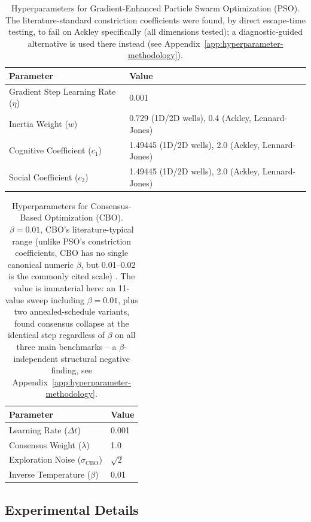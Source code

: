 \documentclass{article} %
\theoremstyle{plain}
\theoremstyle{definition}
\theoremstyle{remark}
\begin{document}
\begin{table}[!htbp]
\centering
\caption{Hyperparameters for Gradient-Enhanced Particle Swarm Optimization (PSO). The literature-standard constriction coefficients were found, by direct escape-time testing, to fail on Ackley specifically (all dimensions tested); a diagnostic-guided alternative is used there instead (see Appendix~\ref{app:hyperparameter-methodology}).}
\label{tab:pso_hyperparams}
\begin{tabular}{@{}ll@{}}
\toprule
\textbf{Parameter} & \textbf{Value} \\
\midrule
Gradient Step Learning Rate ($\eta$) & 0.001 \\
Inertia Weight ($w$) & 0.729 (1D/2D wells), 0.4 (Ackley, Lennard-Jones) \\
Cognitive Coefficient ($c_1$) & 1.49445 (1D/2D wells), 2.0 (Ackley, Lennard-Jones) \\
Social Coefficient ($c_2$) & 1.49445 (1D/2D wells), 2.0 (Ackley, Lennard-Jones) \\
\bottomrule
\end{tabular}
\end{table}

\begin{table}[!htbp]
\centering
\caption{Hyperparameters for Consensus-Based Optimization (CBO). $\beta=0.01$, CBO's literature-typical range (unlike PSO's constriction coefficients, CBO has no single canonical numeric $\beta$, but 0.01--0.02 is the commonly cited scale) . The value is immaterial here: an 11-value sweep including $\beta=0.01$, plus two annealed-schedule variants, found consensus collapse at the identical step regardless of $\beta$ on all three main benchmarks -- a $\beta$-independent structural negative finding, see Appendix~\ref{app:hyperparameter-methodology}.}
\label{tab:cbo_hyperparams}
\begin{tabular}{@{}ll@{}}
\toprule
\textbf{Parameter} & \textbf{Value} \\
\midrule
Learning Rate ($\Delta t$) & 0.001 \\
Consensus Weight ($\lambda$) & 1.0 \\
Exploration Noise ($\sigma_{\text{CBO}}$) & $\sqrt{2}$ \\
Inverse Temperature ($\beta$) & 0.01 \\
\bottomrule
\end{tabular}
\end{table}

\subsection{Experimental Details}
\label{apx:experiment-details}
\end{document}
